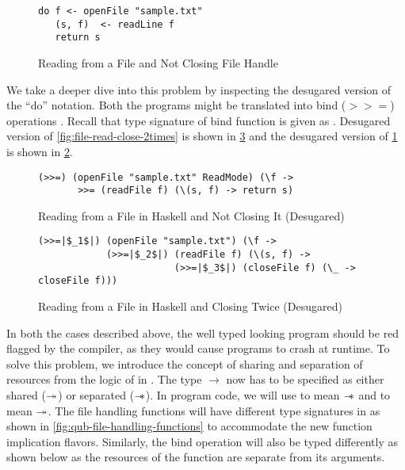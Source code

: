 \begin{figure}[h]
  \begin{framed}
    \begin{verbatim}
do f <- openFile "sample.txt"
   (s, f)  <- readLine f
   return s
    \end{verbatim}
  \end{framed}
  \caption{Reading from a File and Not Closing File Handle}
  \label{fig:file-read-noclose}
\end{figure}

We take a deeper dive into this problem by inspecting the desugared version of the ``do'' notation.
Both the programs might be translated into bind ($>>=$) operations . Recall that type signature of bind function is given as
. Desugared version of \cref{fig:file-read-close-2times}
is shown in \cref{fig:file-read-close-2times-desugared} and the desugared version of \cref{fig:file-read-noclose} is shown in \cref{fig:file-read-noclose-desugared}.

\begin{figure}[h]
\begin{framed}
\begin{verbatim}
(>>=) (openFile "sample.txt" ReadMode) (\f ->
       >>= (readFile f) (\(s, f) -> return s)
\end{verbatim}
  \end{framed}
  \caption{Reading from a File in Haskell and Not Closing It (Desugared)}
  \label{fig:file-read-noclose-desugared}
\end{figure}

\begin{figure}[h]
  \begin{framed}
    \begin{verbatim}
(>>=|$_1$|) (openFile "sample.txt") (\f ->
            (>>=|$_2$|) (readFile f) (\(s, f) ->
                        (>>=|$_3$|) (closeFile f) (\_ -> closeFile f)))
    \end{verbatim}
  \end{framed}
  \caption{Reading from a File in Haskell and Closing Twice (Desugared)}
  \label{fig:file-read-close-2times-desugared}
\end{figure}

In both the cases described above, the well typed looking program should be red flagged by the compiler, as they would
cause programs to crash at runtime. To solve this problem, we introduce the %
concept of sharing and separation of resources from the logic of \BI{} in \qub{}. The type $\rightarrow$ now
has to be specified as either shared ($\twoheadrightarrow$) or separated ($\mathrel{-\mkern-6mu*}$). In \qub{} program code, we will use
\HaskellF{-*>} to mean $\mathrel{-\mkern-6mu*}$ and \HaskellF{-&>} to mean $\twoheadrightarrow$.
The file handling functions will have different type signatures in \qub{} as shown in \cref{fig:qub-file-handling-functions} to accommodate
the new function implication flavors. Similarly, the bind operation will also be typed differently as shown below as the resources of the function are
separate from its arguments.

